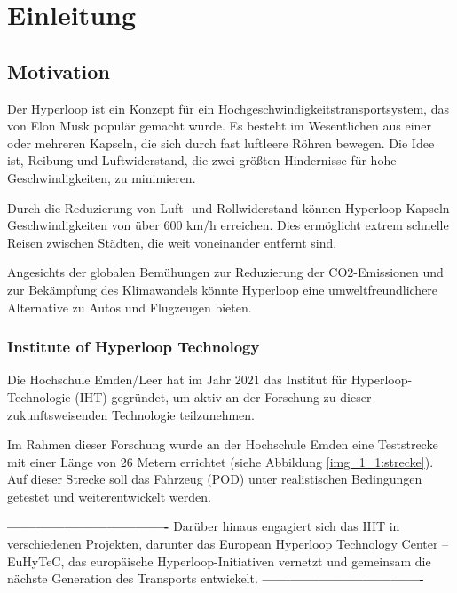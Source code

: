 \chapter{Einleitung}

\section{Motivation}

Der Hyperloop ist ein Konzept für ein Hochgeschwindigkeitstransportsystem, das von Elon Musk \cite{tesla:Hyperloop_impact} populär gemacht wurde. Es besteht im Wesentlichen aus einer oder mehreren Kapseln, die sich durch fast luftleere Röhren bewegen. Die Idee ist, Reibung und Luftwiderstand, die zwei größten Hindernisse für hohe Geschwindigkeiten, zu minimieren.

Durch die Reduzierung von Luft- und Rollwiderstand können Hyperloop-Kapseln Geschwindigkeiten von über 600 km/h erreichen. Dies ermöglicht extrem schnelle Reisen zwischen Städten, die weit voneinander entfernt sind.

Angesichts der globalen Bemühungen zur Reduzierung der CO2-Emissionen und zur Bekämpfung des Klimawandels könnte Hyperloop eine umweltfreundlichere Alternative zu Autos und Flugzeugen bieten.



\subsection{Institute of Hyperloop Technology}
Die Hochschule Emden/Leer hat im Jahr 2021 das Institut für Hyperloop-Technologie (IHT) gegründet, um aktiv an der Forschung zu dieser zukunftsweisenden Technologie teilzunehmen.

Im Rahmen dieser Forschung wurde an der Hochschule Emden eine Teststrecke mit einer Länge von 26 Metern errichtet (siehe Abbildung \ref{img_1_1:strecke}). Auf dieser Strecke soll das Fahrzeug (POD) unter realistischen Bedingungen getestet und weiterentwickelt werden.

\textbf{----------------------------------}\newline
Darüber hinaus engagiert sich das IHT in verschiedenen Projekten, darunter das \frqq European Hyperloop Technology Center – EuHyTeC\flqq, das europäische Hyperloop-Initiativen vernetzt und gemeinsam die nächste Generation des Transports entwickelt.\newline
\textbf{----------------------------------}

